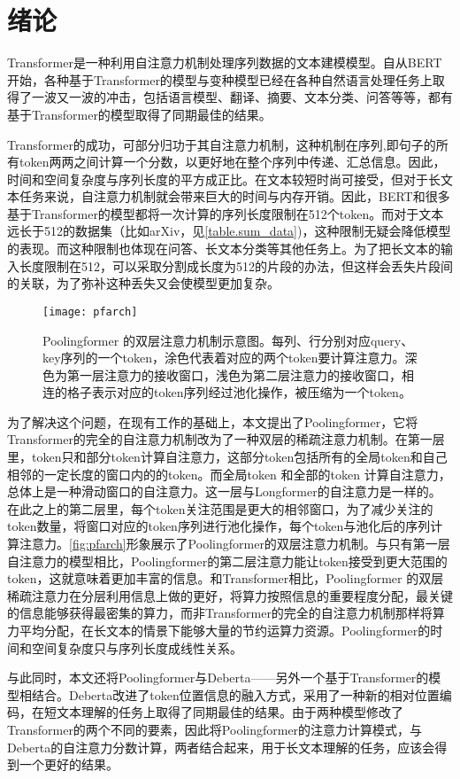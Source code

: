 ﻿
\chapter{绪论}
\label{chap:introduction}

Transformer\cite{vaswani2017attention}是一种利用自注意力机制处理序列数据的文本建模模型。自从BERT \cite{devlin2018bert}开始，各种基于Transformer的模型与变种模型已经在各种自然语言处理任务上取得了一波又一波的冲击，包括语言模型\cite{child2019generating,kitaev2020reformer}、翻译\cite{lewis2019bart}、摘要\cite{qi2020prophetnet}、文本分类\cite{he2020deberta}、问答\cite{lan2019albert,beltagy2020longformer,dai2020funnel}等等，都有基于Transformer的模型取得了同期最佳的结果。

Transformer的成功，可部分归功于其自注意力机制，这种机制在序列,即句子的所有token两两之间计算一个分数，以更好地在整个序列中传递、汇总信息。因此，时间和空间复杂度与序列长度的平方成正比。在文本较短时尚可接受，但对于长文本任务来说，自注意力机制就会带来巨大的时间与内存开销。因此，BERT和很多基于Transformer的模型都将一次计算的序列长度限制在512个token\cite{cohan2018discourse}。而对于文本远长于512的数据集（比如arXiv，见\autoref{table.sum_data})，这种限制无疑会降低模型的表现。而这种限制也体现在问答、长文本分类等其他任务上。为了把长文本的输入长度限制在512，可以采取分割成长度为512的片段的办法，但这样会丢失片段间的关联，为了弥补这种丢失又会使模型更加复杂。

\begin{figure}
\centering
\texttt{[image: pfarch]}
\caption{Poolingformer 的双层注意力机制示意图。每列、行分别对应query、key序列的一个token，涂色代表着对应的两个token要计算注意力。深色为第一层注意力的接收窗口，浅色为第二层注意力的接收窗口，相连的格子表示对应的token序列经过池化操作，被压缩为一个token。}
\label{fig:pfarch}
\end{figure}

为了解决这个问题，在现有工作\cite{beltagy2020longformer,zaheer2020big,miculicich2018document}的基础上，本文提出了Poolingformer，它将Transformer的完全的自注意力机制改为了一种双层的稀疏注意力机制。在第一层里，token只和部分token计算自注意力，这部分token包括所有的全局token和自己相邻的一定长度的窗口内的的token。而全局token 和全部的token 计算自注意力，总体上是一种滑动窗口的自注意力。这一层与Longformer\cite{beltagy2020longformer}的自注意力是一样的。在此之上的第二层里，每个token关注范围是更大的相邻窗口，为了减少关注的token数量，将窗口对应的token序列进行池化操作，每个token与池化后的序列计算注意力。\autoref{fig:pfarch}形象展示了Poolingformer的双层注意力机制。与只有第一层自注意力的模型\cite{beltagy2020longformer,zaheer2020big}相比，Poolingformer的第二层注意力能让token接受到更大范围的token，这就意味着更加丰富的信息。和Transformer相比，Poolingformer 的双层稀疏注意力在分层利用信息上做的更好，将算力按照信息的重要程度分配，最关键的信息能够获得最密集的算力，而非Transformer的完全的自注意力机制那样将算力平均分配，在长文本的情景下能够大量的节约运算力资源。Poolingformer的时间和空间复杂度只与序列长度成线性关系。

与此同时，本文还将Poolingformer与Deberta——另外一个基于Transformer的模型相结合。Deberta\cite{he2020deberta}改进了token位置信息的融入方式，采用了一种新的相对位置编码，在短文本理解的任务上取得了同期最佳的结果。由于两种模型修改了Transformer的两个不同的要素，因此将Poolingformer的注意力计算模式，与Deberta的自注意力分数计算，两者结合起来，用于长文本理解的任务，应该会得到一个更好的结果。
